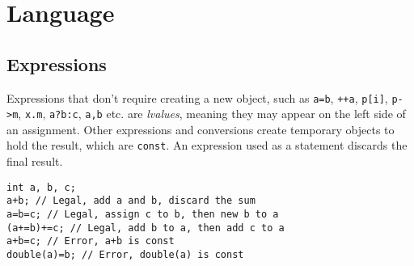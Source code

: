 
\section{Language} %
	
	\subsection{Expressions} %
		
		Expressions that don't require creating a new object, such as \lstinline!a=b!, \lstinline!++a!, \lstinline!p[i]!, \lstinline!p->m!, \lstinline!x.m!, \lstinline!a?b:c!, \lstinline!a,b! etc. are \emph{lvalues}, meaning they may appear on the left side of an assignment. Other expressions and conversions create temporary objects to hold the result, which are \lstinline!const!. An expression used as a statement discards the final result.
		\begin{code}\begin{lstlisting}[style=list]
int a, b, c;
a+b; // Legal, add a and b, discard the sum
a=b=c; // Legal, assign c to b, then new b to a
(a+=b)+=c; // Legal, add b to a, then add c to a
a+b=c; // Error, a+b is const
double(a)=b; // Error, double(a) is const
		\end{lstlisting}\end{code}
		
		
		
		
		
		
		
		
		

